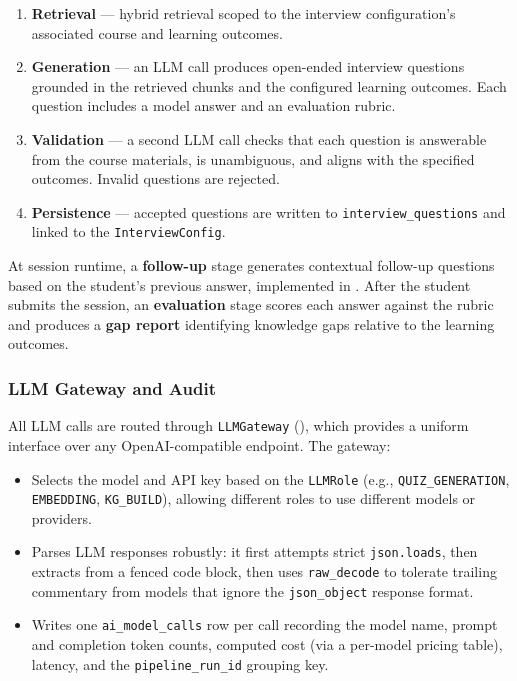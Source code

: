 \begin{enumerate}
    \item \textbf{Retrieval} — hybrid retrieval scoped to the interview configuration's associated course and learning outcomes.
    \item \textbf{Generation} — an LLM call produces open-ended interview questions grounded in the retrieved chunks and the configured learning outcomes. Each question includes a model answer and an evaluation rubric.
    \item \textbf{Validation} — a second LLM call checks that each question is answerable from the course materials, is unambiguous, and aligns with the specified outcomes. Invalid questions are rejected.
    \item \textbf{Persistence} — accepted questions are written to \texttt{interview\_questions} and linked to the \texttt{InterviewConfig}.
\end{enumerate}

At session runtime, a \textbf{follow-up} stage generates contextual follow-up questions based on the student's previous answer, implemented in . After the student submits the session, an \textbf{evaluation} stage scores each answer against the rubric and produces a \textbf{gap report} identifying knowledge gaps relative to the learning outcomes.

\subsubsection{LLM Gateway and Audit}
\label{sec:impl_llm_gateway}

All LLM calls are routed through \texttt{LLMGateway} (), which provides a uniform interface over any OpenAI-compatible endpoint. The gateway:
\begin{itemize}
    \item Selects the model and API key based on the \texttt{LLMRole} (e.g., \texttt{QUIZ\_GENERATION}, \texttt{EMBEDDING}, \texttt{KG\_BUILD}), allowing different roles to use different models or providers.
    \item Parses LLM responses robustly: it first attempts strict \texttt{json.loads}, then extracts from a fenced code block, then uses \texttt{raw\_decode} to tolerate trailing commentary from models that ignore the \texttt{json\_object} response format.
    \item Writes one \texttt{ai\_model\_calls} row per call recording the model name, prompt and completion token counts, computed cost (via a per-model pricing table), latency, and the \texttt{pipeline\_run\_id} grouping key.
\end{itemize}
